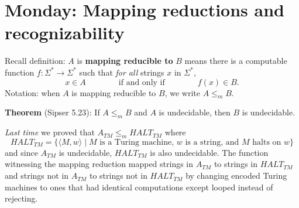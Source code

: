 \documentclass[12pt, oneside]{article}
\begin{document}
\begin{flushright}
\end{flushright} 
\section*{Monday: Mapping reductions and recognizability}




Recall definition:  $A$ is  {\bf  mapping  reducible to} $B$  means there is a computable function 
$f : \Sigma^* \to \Sigma^*$ such that {\it for all} strings  $x$ in $\Sigma^*$, 
\[
x  \in  A \qquad \qquad \text{if and  only  if} \qquad \qquad f(x) \in B.
\]
Notation:  when $A$  is mapping reducible to $B$, we write $A  \leq_m B$.

{\bf Theorem} (Sipser 5.23): If $A \leq_m B$ and $A$ is undecidable, then $B$ is undecidable.
    

{\it Last time} we proved that $A_{TM} \le_m HALT_{TM}$ where
    \[
    HALT_{TM} = \{ \langle M, w \rangle \mid \text{$M$ is a  Turing machine, $w$ is  a string, and $M$ halts on $w$} \}
    \]
and since $A_{TM}$ is undecidable, $HALT_{TM}$ is also undecidable. The function 
witnessing the mapping reduction mapped strings in $A_{TM}$ to strings in $HALT_{TM}$ and 
strings not in $A_{TM}$ to strings not in $HALT_{TM}$ by changing encoded Turing machines to 
ones that had identical computations except looped instead of rejecting.

\begin{comment}
Define $F: \Sigma^* \to \Sigma^*$ by
    \[
    F(x) =  \begin{cases}
    const_{out} \qquad &\text{if  $x \neq \langle M,w \rangle$ for any Turing machine  $M$ and string  $w$ over the alphabet of $M$} \\
    \langle M', w \rangle \qquad &  \text{if $x = \langle M, w \rangle$ for some Turing machine  $M$ and string $w$ over the alphabet of $M$.}
    \end{cases}
    \]
    where $const_{out}  =  \langle  \texttt{[image: Lect22TM1.png]} ,  \varepsilon  \rangle$
    and  $M'$ is a Turing machine that computes like $M$ except, if the computation ever were to go to a  reject state,
    $M'$ loops instead.
    
    \vfill

    $F( \langle \texttt{[image: Lect22TM1.png]} ,  001  \rangle)$ =

    \vfill

    $F( \langle \texttt{[image: Lect22TM2.png]} ,  1  \rangle)$ =

    \vfill
    
    \newpage
    To use this function  to prove that $A_{TM} \leq_m HALT_{TM}$, we need  two claims:

    
    Claim (1): $F$ is computable \phantom{\hspace{2in}}
    
    \vfill

    Claim (2): for every  $x$,  $x \in  A_{TM}$ iff $F(x) \in HALT_{TM}$.  
    
    \vfill
\end{comment}
\end{document}
